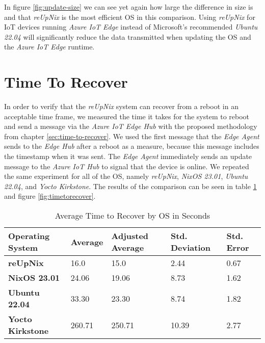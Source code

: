\noindent
In figure \ref{fig:update-size} we can see yet again how large the difference
in size is and that \textit{reUpNix} is the most efficient \ac{OS} in this comparison.
Using \textit{reUpNix} for \ac{IoT} devices running \textit{Azure IoT Edge}
instead of Microsoft's recommended \textit{Ubuntu 22.04} will significantly reduce
the data transmitted when updating the \ac{OS} and the \textit{Azure IoT Edge} runtime.

\section{Time To Recover}
In order to verify that the \textit{reUpNix} system can recover from a reboot
in an acceptable time frame, we measured the time it takes for the system to
reboot and send a message via the \textit{Azure IoT Edge Hub} with the proposed
methodology from chapter \ref{sec:time-to-recover}. We used the first message
that the \textit{Edge Agent} sends to the \textit{Edge Hub} after a reboot as
a measure, because this message includes the timestamp when it was sent.
The \textit{Edge Agent} immediately sends an update message to the \textit{Azure
IoT Hub} to signal that the device is online. We repeated the same experiment
for all of the \ac{OS}, namely \textit{reUpNix}, \textit{NixOS 23.01},
\textit{Ubuntu 22.04}, and \textit{Yocto Kirkstone}. The results of the comparison
can be seen in table \ref{tab:timetorecover} and figure \ref{fig:timetorecover}.


\begin{table}[H]
	\centering
	\begin{tabular}{l|l|l|l|l}
	\toprule
		Operating System & Average & Adjusted Average\footnote &  Std. Deviation & Std. Error \\
	\midrule
    \textbf{reUpNix} & 16.0 & 15.0 &  2.44 & 0.67 \\
    \textbf{NixOS 23.01} & 24.06 & 19.06 & 8.73 & 1.62 \\
    \textbf{Ubuntu 22.04} & 33.30 & 23.30 & 8.74 & 1.82 \\
    \textbf{Yocto Kirkstone} & 260.71 & 250.71 & 10.39  & 2.77 \\
	\bottomrule
	\end{tabular}
	\caption{Average Time to Recover by OS in Seconds}
	\label{tab:timetorecover}
\end{table}

